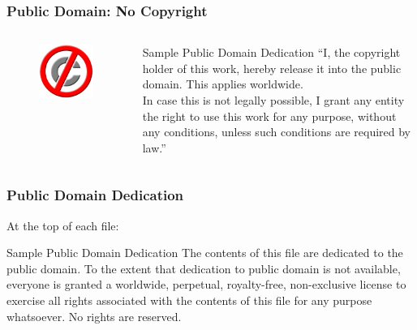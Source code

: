 \documentclass{beamer}
\begin{document}
\begin{frame}
\frametitle{Public Domain: No Copyright}

\begin{columns}

\column[t]{2.5cm}

\begin{figure}
\vspace{0.2cm}
\begin{flushleft}
	\includegraphics[scale=0.3,clip=true]{figs/no-copyright-public-domain.jpg}
\end{flushleft}
\end{figure}

\column[t]{8cm}
\vspace{-0.5cm}
\begin{block}{Sample Public Domain Dedication}
``I, the copyright holder of this work, hereby release it into the public domain. This applies worldwide. \\
\medskip
In case this is not legally possible, I grant any entity the right to use this work for any purpose, without any conditions, unless such conditions are required by law.''
\end{block}

\end{columns}


\end{frame}



\begin{frame}
\frametitle{Public Domain Dedication}

At the top of each file:
\begin{block}{Sample Public Domain Dedication}
The contents of this file are dedicated to the public domain. To the extent that dedication to public domain is not available, everyone is granted a worldwide, perpetual, royalty-free, non-exclusive license to exercise all rights associated with the contents of this file for any purpose whatsoever. No rights are reserved.
\end{block}

\end{frame}
\end{document}
